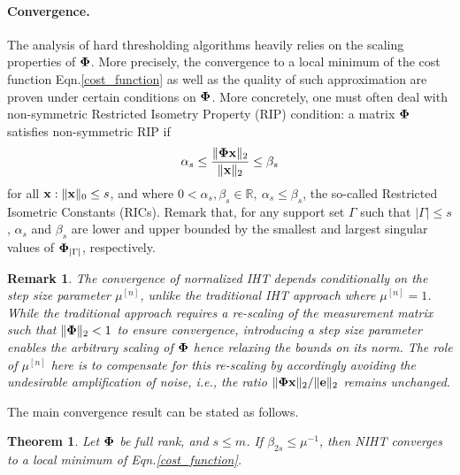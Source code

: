\documentclass{article}
\newtheorem{theorem}{Theorem}
\newtheorem{remark}{Remark}
\begin{document}

\vspace{-0.5em}
\paragraph{Convergence.} 
The analysis of hard thresholding algorithms heavily relies on the scaling properties of ${\bf \Phi}$. More precisely, the convergence to a local minimum of the cost function Eqn.\ref{cost_function} as well as the quality of such approximation are proven under certain conditions on ${\bf \Phi}$. More concretely, one must often deal with non-symmetric Restricted Isometry Property (RIP) condition: a matrix ${\bf \Phi}$ satisfies non-symmetric RIP if
\begin{equation}\label{rip}
\small
\alpha_{s} \leq \frac{\|{\bf \Phi} {\bf x}\|_2}{\|{\bf x}\|_2} \leq \beta_{s}
\end{equation}
\vspace{0.5em}
for all ${\bf x}: \|{\bf x}\|_0 \leq s$, and where $0<\alpha_s, \beta_s \in \mathbb{R}, \ \alpha_s\leq \beta_s$, the so-called Restricted Isometric Constants (RICs). Remark that, for any support set $\Gamma$ such that $|\Gamma| \leq s$, $\alpha_s$ and $\beta_s$ are lower and upper bounded by the smallest and largest singular values of ${\bf \Phi}_{|\Gamma|}$, respectively.

\begin{remark}\label{remark_noise_amp}
The convergence of normalized IHT depends conditionally on the step size parameter $\mu^{[n]}$, unlike the traditional IHT approach where $\mu^{[n]}=1$.
While the traditional approach requires a re-scaling of the measurement matrix such that $\|{\bf \Phi}\|_2 <1$ to ensure convergence, introducing a step size parameter enables the arbitrary scaling of ${\bf \Phi}$ hence relaxing the bounds on its norm. The role of $\mu^{[n]}$ here is to compensate for this re-scaling by accordingly avoiding the undesirable amplification of noise, i.e., the ratio $\|{\bf \Phi x}\|_2/\|{\bf e}\|_2$ remains unchanged. 
\end{remark}
\vspace{-0.8em}
The main convergence result  can be stated as follows.
\begin{theorem}\label{theorem_convergence_IHT}
{\rm{\cite{blumensath2012greedy}}}
Let ${\bf \Phi}$ be full rank, and $s\leq m$. If $\beta_{2s}\leq\mu^{-1}$, then NIHT converges to a local minimum of Eqn.\ref{cost_function}.
\end{theorem}
\end{document}
